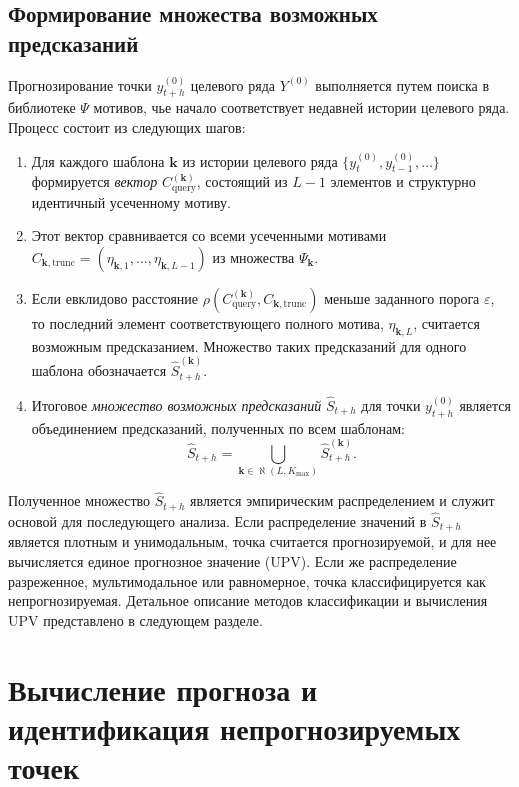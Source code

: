 \documentclass[a4paper,12pt]{extarticle}
\begin{document}
\subsection{Формирование множества возможных предсказаний}

Прогнозирование точки $y_{t+h}^{(0)}$ целевого ряда $Y^{(0)}$
 выполняется путем поиска в библиотеке $\Psi$ мотивов, чье начало
  соответствует недавней истории целевого ряда. Процесс состоит из следующих шагов:
\begin{enumerate}
    \item Для каждого шаблона $\boldsymbol{k}$ из истории целевого
     ряда $\{y_{t}^{(0)}, y_{t-1}^{(0)}, \dots\}$ формируется \textit{вектор}
      $C_{\text{query}}^{(\boldsymbol{k})}$, состоящий из $L-1$ элементов
       и структурно идентичный усеченному мотиву.

    \item Этот вектор сравнивается со всеми усеченными мотивами $C_{\boldsymbol{k},
     \text{trunc}} = (\eta_{\boldsymbol{k},1}, \dots, \eta_{\boldsymbol{k}, L-1})$
     из множества $\Psi_{\boldsymbol{k}}$.

    \item Если евклидово расстояние $\rho(C_{\text{query}}^{(\boldsymbol{k})},
     C_{\boldsymbol{k}, \text{trunc}})$ меньше заданного порога $\varepsilon$,
      то последний элемент соответствующего полного мотива, $\eta_{\boldsymbol{k},L}$,
       считается возможным предсказанием. Множество таких предсказаний для одного шаблона
       обозначается $\hat{S}_{t+h}^{(\boldsymbol{k})}$.

    \item Итоговое \textit{множество возможных предсказаний} $\hat{S}_{t+h}$ для
     точки $y_{t+h}^{(0)}$ является объединением предсказаний, полученных по всем шаблонам:
    \[
    \hat{S}_{t+h} = \bigcup_{\boldsymbol{k} \in \aleph(L, K_{\max})} \hat{S}_{t+h}^{(\boldsymbol{k})}.
    \]
\end{enumerate}

Полученное множество $\hat{S}_{t+h}$ является эмпирическим распределением и служит
 основой для последующего анализа. Если распределение значений в $\hat{S}_{t+h}$
  является плотным и унимодальным, точка считается прогнозируемой, и для нее
  вычисляется единое прогнозное значение (UPV). Если же распределение разреженное,
   мультимодальное или равномерное, точка классифицируется как непрогнозируемая.
    Детальное описание методов классификации и вычисления UPV представлено в следующем разделе.
\section{Вычисление прогноза и идентификация непрогнозируемых точек}
\end{document}
